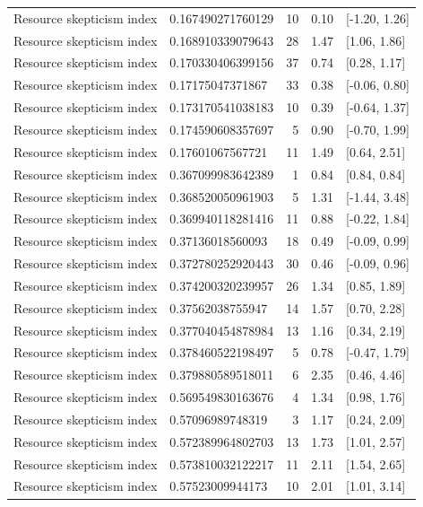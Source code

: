 \begin{tabular}{llrll}
Resource skepticism index & 0.167490271760129 & 10 & 0.10 & {}[-1.20, 1.26]\\
Resource skepticism index & 0.168910339079643 & 28 & 1.47 & {}[1.06, 1.86]\\
\addlinespace
Resource skepticism index & 0.170330406399156 & 37 & 0.74 & {}[0.28, 1.17]\\
Resource skepticism index & 0.17175047371867 & 33 & 0.38 & {}[-0.06, 0.80]\\
Resource skepticism index & 0.173170541038183 & 10 & 0.39 & {}[-0.64, 1.37]\\
Resource skepticism index & 0.174590608357697 & 5 & 0.90 & {}[-0.70, 1.99]\\
Resource skepticism index & 0.17601067567721 & 11 & 1.49 & {}[0.64, 2.51]\\
\addlinespace
Resource skepticism index & 0.367099983642389 & 1 & 0.84 & {}[0.84, 0.84]\\
Resource skepticism index & 0.368520050961903 & 5 & 1.31 & {}[-1.44, 3.48]\\
Resource skepticism index & 0.369940118281416 & 11 & 0.88 & {}[-0.22, 1.84]\\
Resource skepticism index & 0.37136018560093 & 18 & 0.49 & {}[-0.09, 0.99]\\
Resource skepticism index & 0.372780252920443 & 30 & 0.46 & {}[-0.09, 0.96]\\
\addlinespace
Resource skepticism index & 0.374200320239957 & 26 & 1.34 & {}[0.85, 1.89]\\
Resource skepticism index & 0.37562038755947 & 14 & 1.57 & {}[0.70, 2.28]\\
Resource skepticism index & 0.377040454878984 & 13 & 1.16 & {}[0.34, 2.19]\\
Resource skepticism index & 0.378460522198497 & 5 & 0.78 & {}[-0.47, 1.79]\\
Resource skepticism index & 0.379880589518011 & 6 & 2.35 & {}[0.46, 4.46]\\
\addlinespace
Resource skepticism index & 0.569549830163676 & 4 & 1.34 & {}[0.98, 1.76]\\
Resource skepticism index & 0.57096989748319 & 3 & 1.17 & {}[0.24, 2.09]\\
Resource skepticism index & 0.572389964802703 & 13 & 1.73 & {}[1.01, 2.57]\\
Resource skepticism index & 0.573810032122217 & 11 & 2.11 & {}[1.54, 2.65]\\
Resource skepticism index & 0.57523009944173 & 10 & 2.01 & {}[1.01, 3.14]\\

\end{tabular}
